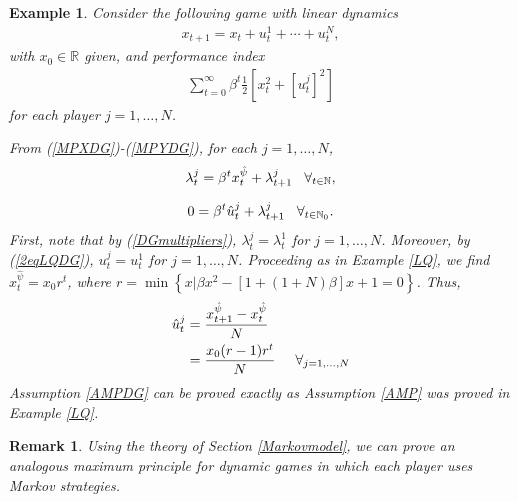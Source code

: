 \documentclass[3p]{elsarticle}
\newcommand{\nat}{\mathbb N_0}
\newcommand{\natu}{\mathbb N}
\newtheorem{examp}[thm]{Example}
\newtheorem{remark}[thm]{Remark}
\begin{document}
	\begin{examp}
		Consider the following game with linear dynamics
		\begin{align*}
		x_{t+1}=x_t+u_t^1+\cdots+u_t^N,
		\end{align*}
		with $x_0\in\mathbb R$ given, and performance index 
		\begin{align*}
		\sum_{t=0}^\infty\beta^t\frac{1}{2}\left[x_t^2+[u_t^j]^2 \right] 
		\end{align*}
		for each player $j=1,\dots,N$.
		
		
		From (\ref{MPXDG})-(\ref{MPYDG}),
		for each $j=1,\dots,N$,
		\begin{align}
		\lambda_t^j=\beta^tx_t^{\hat{\psi}}+\lambda_{t+1}^j \hspace{0.3cm}\forall_{t\in\natu},
		\end{align}
		
		\begin{align}\label{2eqLQDG}
		0=\beta^t \hat u_t^j+\lambda^j_{t+1} \hspace{0.3cm}\forall_{t\in\nat}.
		\end{align}
		First, note that by (\ref{DGmultipliers}), $\lambda_t^j=\lambda_t^1$ for $j=1,\dots,N$. Moreover, by (\ref{2eqLQDG}), $u_t^j=u_t^1$ for $j=1,\dots,N$.
		Proceeding as in Example \ref{LQ}, we find $x_t^{\hat{\psi}}=x_0r^t$, where $r=\min\left\lbrace x|\beta x^2-[1+(1+N)\beta]x+1=0 \right\rbrace $. Thus,
		\begin{align*}
		\hat u_t^j&=\frac{x_{t+1}^{\hat\psi}-x_{t}^{\hat\psi}}{N}\\
		&=\frac{x_0(r-1)r^t}{N}\hspace{0.5cm}\forall_{j=1,\dots,N}
		\end{align*}
		Assumption \ref{AMPDG} can be proved exactly as Assumption \ref{AMP} was proved in Example \ref{LQ}.
	\end{examp} 
	
	
	
	\begin{remark}
		Using the theory of Section \ref{Markovmodel}, we can prove an analogous maximum principle for dynamic games in which each player uses Markov strategies.
	\end{remark}
	
	
	
	
	
	
	
	
	
	
	
	
	
	
	
\end{document}

